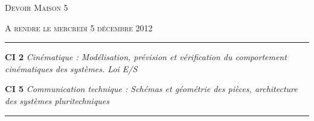 \documentclass[11pt,oneside]{article}
\begin{document}
\pagestyle{fancy}
\renewcommand{\headrulewidth}{0pt}

\fancyhead{}

\fancyhead[C]{\rule{12cm}{.5pt}}


\renewcommand{\footrulewidth}{0.2pt}

\fancyfoot[C]{\footnotesize{\bfseries \thepage}}
\ifthenelse{\boolean{prof}}{%
\fancyfoot[R]{\footnotesize{DM 3} -- CI 2 : Cinématique \& CI 5 : Communication technique}
}{%
\fancyfoot[R]{\footnotesize{DM 3}}%
}



\begin{center}
 \Large\textsc{Devoir Maison 5}
\end{center}

\begin{center}
 \large\textsc{A rendre le mercredi 5 décembre 2012} 
\end{center}


\vspace{0.5cm}


\noindent\rule{\linewidth}{.2pt}
\begin{center}
 \large\textbf{CI 2} \textit{Cinématique : Modélisation, prévision et vérification du comportement cinématiques des systèmes. Loi E/S}

 \large\textbf{CI 5} \textit{Communication technique : Schémas et géométrie des pièces, architecture des systèmes pluritechniques}
\end{center}
\noindent\rule{\linewidth}{.2pt}
\end{document}
